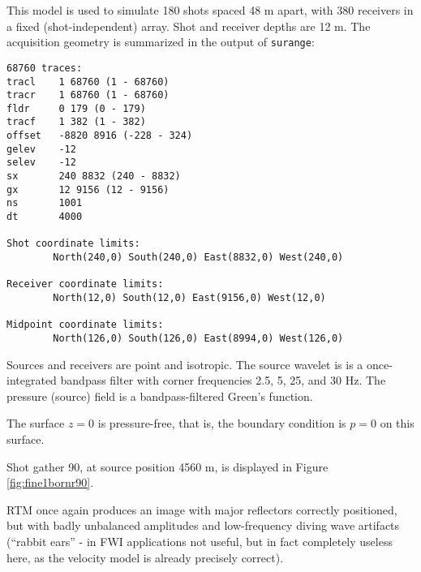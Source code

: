 

This model is used to simulate 180 shots spaced 48 m apart, with 380
receivers in a fixed (shot-independent) array. Shot and receiver
depths are 12 m. The acquisition geometry is summarized in the output
of {\tt surange}:
\begin{verbatim}
68760 traces:
tracl    1 68760 (1 - 68760)
tracr    1 68760 (1 - 68760)
fldr     0 179 (0 - 179)
tracf    1 382 (1 - 382)
offset   -8820 8916 (-228 - 324)
gelev    -12
selev    -12
sx       240 8832 (240 - 8832)
gx       12 9156 (12 - 9156)
ns       1001
dt       4000

Shot coordinate limits:
        North(240,0) South(240,0) East(8832,0) West(240,0)

Receiver coordinate limits:
        North(12,0) South(12,0) East(9156,0) West(12,0)

Midpoint coordinate limits:
        North(126,0) South(126,0) East(8994,0) West(126,0)
\end{verbatim}

Sources and receivers are point and isotropic. The source wavelet is
is a once-integrated bandpass filter with corner frequencies 2.5, 5,
25, and 30 Hz. The pressure (source) field is a
bandpass-filtered Green's function.  

The surface $z=0$ is pressure-free, that is, the boundary condition is
$p=0$ on this surface.

Shot gather 90, at source position 4560 m, is displayed in Figure
\ref{fig:fine1bornr90}. 


RTM once again produces an image with major reflectors correctly
positioned, but with badly unbalanced amplitudes and low-frequency
diving wave artifacts (``rabbit ears'' - in FWI applications not
useful, but in fact completely useless here, as the velocity model is
already precisely correct).


